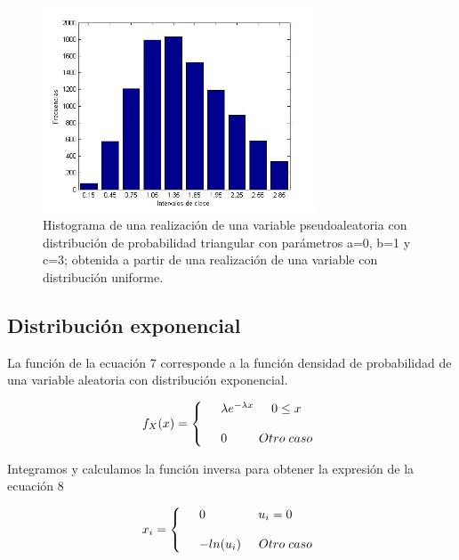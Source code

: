 \documentclass[10pt,journal,compsoc]{IEEEtran}
\begin{document}
\begin{figure}[t]
\label{fig:triangular}
\begin{center}
\centering
\includegraphics[width=3.2in]{triangular.jpg}
\caption{Histograma de una realizaci\'on de una variable pseudoaleatoria con distribuci\'on de probabilidad triangular con par\'ametros a=0, b=1 y c=3; obtenida a partir de una realizaci\'on de una variable con distribuci\'on uniforme.}
\end{center}
\end{figure}

\subsection{Distribuci\'on exponencial}
La funci\'on de la ecuaci\'on 7 corresponde a la funci\'on densidad de probabilidad de una variable aleatoria con distribuci\'on exponencial.

\begin{align}
  f_{X}(x) = \left\{
  \begin{array}{rl}
	&\lambda e^{-\lambda x} \hspace{0.5cm} 0 \le x\\\\
	&0 \hspace{0.9 cm} Otro \hspace{0.1cm} caso
  \end{array} \right.
\end{align}

Integramos y calculamos la funci\'on inversa para obtener la expresi\'on de la ecuaci\'on 8

\begin{align}
 x_i = \left\{
  \begin{array}{rl}
	&0 \hspace{1.5 cm} u_i = 0\\\\
	&-ln(u_i) \hspace{0.5cm} Otro \hspace{0.1cm} caso
  \end{array} \right.
\end{align}
\end{document}
